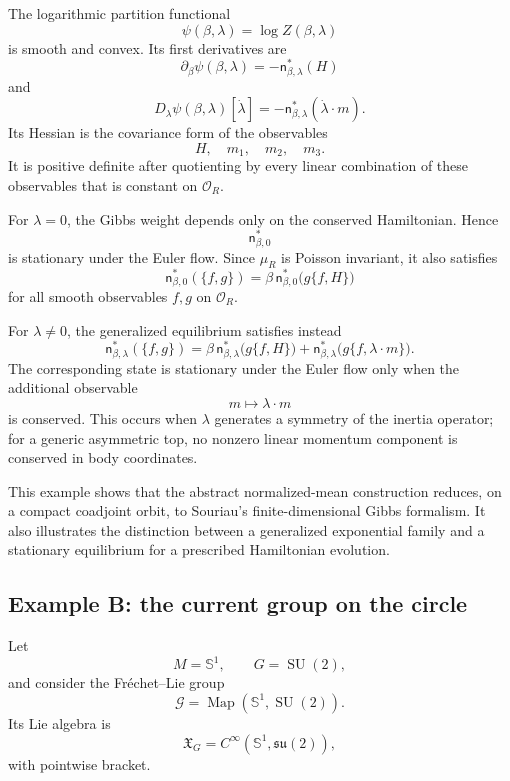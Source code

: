 \documentclass[11pt,reqno]{amsart}
\begin{document}
The logarithmic partition functional
\[
\psi(\beta,\lambda)
=
\log Z(\beta,\lambda)
\]
is smooth and convex. Its first derivatives are
\[
\partial_\beta\psi(\beta,\lambda)
=
-\mathsf n_{\beta,\lambda}^*(H)
\]
and
\[
D_\lambda\psi(\beta,\lambda)[\dot\lambda]
=
-\mathsf n_{\beta,\lambda}^*(\dot\lambda\cdot m).
\]
Its Hessian is the covariance form of the observables
\[
H,\quad m_1,\quad m_2,\quad m_3.
\]
It is positive definite after quotienting by every linear combination
of these observables that is constant on $\mathcal O_R$.

For $\lambda=0$, the Gibbs weight depends only on the conserved
Hamiltonian. Hence
\[
\mathsf n_{\beta,0}^*
\]
is stationary under the Euler flow. Since $\mu_R$ is Poisson invariant,
it also satisfies
\[
\mathsf n_{\beta,0}^*(\{f,g\})
=
\beta\,
\mathsf n_{\beta,0}^*
\bigl(g\{f,H\}\bigr)
\]
for all smooth observables $f,g$ on $\mathcal O_R$.

For $\lambda\neq0$, the generalized equilibrium satisfies instead
\[
\mathsf n_{\beta,\lambda}^*(\{f,g\})
=
\beta\,
\mathsf n_{\beta,\lambda}^*
\bigl(g\{f,H\}\bigr)
+
\mathsf n_{\beta,\lambda}^*
\bigl(g\{f,\lambda\cdot m\}\bigr).
\]
The corresponding state is stationary under the Euler flow only when
the additional observable
\[
m\longmapsto\lambda\cdot m
\]
is conserved. This occurs when $\lambda$ generates a symmetry of the
inertia operator; for a generic asymmetric top, no nonzero linear
momentum component is conserved in body coordinates.

This example shows that the abstract normalized-mean construction
reduces, on a compact coadjoint orbit, to Souriau's
finite-dimensional Gibbs formalism. It also illustrates the distinction
between a generalized exponential family and a stationary equilibrium
for a prescribed Hamiltonian evolution.
\subsection{Example B: the current group on the circle}

Let
\[
M=\mathbb S^1,
\qquad
G=\operatorname{SU}(2),
\]
and consider the Fréchet--Lie group
\[
\mathcal G
=
\operatorname{Map}(\mathbb S^1,\operatorname{SU}(2)).
\]
Its Lie algebra is
\[
\mathfrak X_G
=
C^\infty(\mathbb S^1,\mathfrak{su}(2)),
\]
with pointwise bracket.
\end{document}
